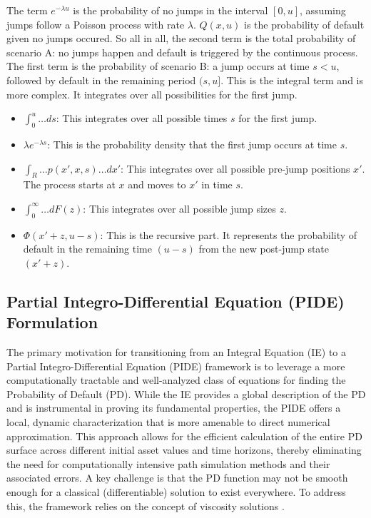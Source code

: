 \documentclass[11pt,twoside,openright]{report}
\begin{document}
The term $e^{-\lambda u}$ is the probability of no jumps in the interval $[0, u]$, assuming jumps follow a Poisson process with rate $\lambda$. $Q(x, u)$ is the probability of default given no jumps occured. So all in all, the second term is the total probability of scenario A: no jumps happen and default is triggered by the continuous process.\\
The first term is the probability of scenario B: a jump occurs at time $s < u$, followed by default in the remaining period $(s, u]$. This is the integral term and is more complex. It integrates over all possibilities for the first jump.
\begin{itemize}
    \item $\int_0^u \dots ds$: This integrates over all possible times $s$ for the first jump.
    \item $\lambda e^{-\lambda s}$: This is the probability density that the first jump occurs at time $s$.
    \item $\int_R \dots p(x', x, s) \dots dx'$: This integrates over all possible pre-jump positions $x'$. The process starts at $x$ and moves to $x'$ in time $s$.
    \item $\int_0^\infty \dots dF(z)$: This integrates over all possible jump sizes $z$.
    \item $\Phi(x' + z, u - s)$: This is the recursive part. It represents the probability of default in the remaining time $(u-s)$ from the new post-jump state $(x'+z)$.
\end{itemize}

\subsection{Partial Integro-Differential Equation (PIDE) Formulation}

The primary motivation for transitioning from an Integral Equation (IE) to a Partial Integro-Differential Equation (PIDE) framework is to leverage a more computationally tractable and well-analyzed class of equations for finding the Probability of Default (PD). While the IE provides a global description of the PD and is instrumental in proving its fundamental properties, the PIDE offers a local, dynamic characterization that is more amenable to direct numerical approximation. This approach allows for the efficient calculation of the entire PD surface across different initial asset values and time horizons, thereby eliminating the need for computationally intensive path simulation methods and their associated errors. A key challenge is that the PD function may not be smooth enough for a classical (differentiable) solution to exist everywhere. To address this, the framework relies on the concept of viscosity solutions \cite{hamadene2016viscosity}.
\end{document}
